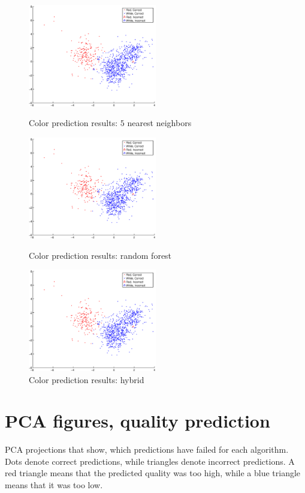 \documentclass[twoside]{article}
\begin{document}
\begin{multicols}{2}
\begin{figure}[H]
\centering
\includegraphics[width=0.5\textwidth]{colorpca/knn5}
\caption{Color prediction results: $5$ nearest neighbors}
\vspace{4.1mm}
\includegraphics[width=0.5\textwidth]{colorpca/random_forest}
\caption{Color prediction results: random forest}
\vspace{4.1mm}
\includegraphics[width=0.5\textwidth]{colorpca/cvv2f_f}
\caption{Color prediction results: hybrid}

\end{figure}

\section{PCA figures, quality prediction}\label{appendix:qualitypcakuvet}
PCA projections that show, which predictions have failed for each algorithm.
Dots denote correct predictions, while triangles denote incorrect predictions.
A red triangle means that the predicted quality was too high, while a blue
triangle means that it was too low. 


\end{multicols}
\end{document}
